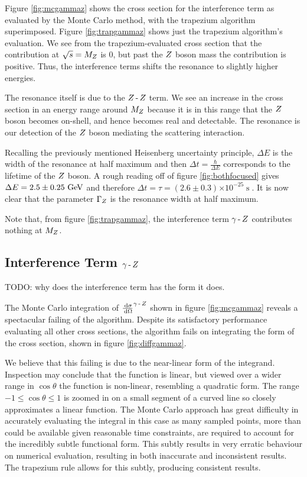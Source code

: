 \documentclass[]{article}
\providecommand{\e}[1]{\ensuremath{\times 10^{#1}}}
\begin{document}
Figure \ref{fig:mcgammaz} shows the cross section for the interference term as evaluated by the Monte Carlo method, with the trapezium algorithm superimposed. Figure \ref{fig:trapgammaz} shows just the trapezium algorithm's evaluation. We see from the trapezium-evaluated cross section that the contribution at $\sqrt{s}=M_{Z }$ is $0$, but past the $Z $ boson mass the contribution is positive. Thus, the interference terms shifts the resonance to slightly higher energies.

The resonance itself is due to the $Z \operatorname{-}Z $ term. We see an increase in the cross section in an energy range around $M_{Z }$ because it is in this range that the $Z $ boson becomes on-shell, and hence becomes real and detectable. The resonance is our detection of the $Z $ boson mediating the scattering interaction.

Recalling the previously mentioned Heisenberg uncertainty principle, $\Delta E$ is the width of the resonance at half maximum and then $\Delta t = \frac{\hbar}{\Delta E}$ corresponds to the lifetime of the $Z $ boson. A rough reading off of figure \ref{fig:bothfocused} gives $\Delta E = 2.5\pm0.25\GeV$ and therefore $\Delta t = \tau = (2.6\pm0.3)\e{-25} \operatorname{s}$. It is now clear that the parameter $\Gamma_{Z }$ is the resonance width at half maximum.

Note that, from figure \ref{fig:trapgammaz}, the interference term $\gamma\operatorname{-}Z $ contributes nothing at $M_{Z }$.

\subsection{Interference Term $\gamma\operatorname{-}Z $}\label{ssec:interference}

TODO: why does the interference term has the form it does.

The Monte Carlo integration of $\frac{\,\operatorname{d}\!{\sigma}}{\,\operatorname{d}\!{\Omega}}^{\gamma\operatorname{-}Z }$ shown in figure \ref{fig:mcgammaz} reveals a spectacular failing of the algorithm. Despite its satisfactory performance evaluating all other cross sections, the algorithm fails on integrating the form of the cross section, shown in figure \ref{fig:diffgammaz}.

We believe that this failing is due to the near-linear form of the integrand. Inspection may conclude that the function is linear, but viewed over a wider range in $\cos{\theta}$ the function is non-linear, resembling a quadratic form. The range $-1\leq\cos{\theta}\leq1$ is zoomed in on a small segment of a curved line so closely approximates a linear function. The Monte Carlo approach has great difficulty in accurately evaluating the integral in this case as many sampled points, more than could be available given reasonable time constraints, are required to account for the incredibly subtle functional form. This subtly results in very erratic behaviour on numerical evaluation, resulting in both inaccurate and inconsistent results. The trapezium rule allows for this subtly, producing consistent results.
\end{document}
